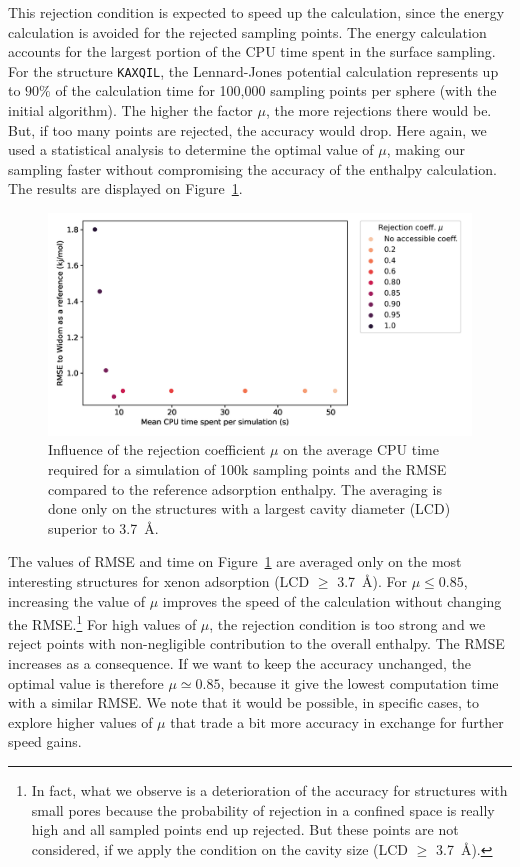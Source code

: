 \documentclass[main]{subfiles}
\begin{document}
This rejection condition is expected to speed up the calculation, since the energy calculation is avoided for the rejected sampling points. The energy calculation accounts for the largest portion of the CPU time spent in the surface sampling. For the structure \texttt{KAXQIL}\cite{Banerjee_2012}, the Lennard-Jones potential calculation represents up to $90\%$ of the calculation time for 100,000 sampling points per sphere (with the initial algorithm). The higher the factor $\mu$, the more rejections there would be. But, if too many points are rejected, the accuracy would drop. Here again, we used a statistical analysis to determine the optimal value of $\mu$, making our sampling faster without compromising the accuracy of the enthalpy calculation. The results are displayed on Figure~\ref{fgr:rejection}.

\begin{figure}[ht]
\centering
  \includegraphics[width=0.7\linewidth]{figures/3-fastsim/rejection_coeff_optimisation.png}
  \caption{Influence of the rejection coefficient $\mu$ on the average CPU time required for a simulation of 100k sampling points and the RMSE compared to the reference adsorption enthalpy. The averaging is done only on the structures with a largest cavity diameter (LCD) superior to \SI{3.7}{\angstrom}. }\label{fgr:rejection}
\end{figure}

The values of RMSE and time on Figure~\ref{fgr:rejection} are averaged only on the most interesting structures for xenon adsorption (LCD $\geq$ \SI{3.7}{\angstrom}). For $\mu\leq 0.85$, increasing the value of $\mu$ improves the speed of the calculation without changing the RMSE.\footnote{In fact, what we observe is a deterioration of the accuracy for structures with small pores because the probability of rejection in a confined space is really high and all sampled points end up rejected. But these points are not considered, if we apply the condition on the cavity size (LCD $\geq$ \SI{3.7}{\angstrom}).} For high values of $\mu$, the rejection condition is too strong and we reject points with non-negligible contribution to the overall enthalpy. The RMSE increases as a consequence. If we want to keep the accuracy unchanged, the optimal value is therefore $\mu \simeq 0.85$, because it give the lowest computation time with a similar RMSE. We note that it would be possible, in specific cases, to explore higher values of $\mu$ that trade a bit more accuracy in exchange for further speed gains.
\end{document}
